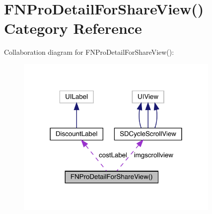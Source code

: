 \hypertarget{category_f_n_pro_detail_for_share_view_07_08}{}\section{F\+N\+Pro\+Detail\+For\+Share\+View() Category Reference}
\label{category_f_n_pro_detail_for_share_view_07_08}


Collaboration diagram for F\+N\+Pro\+Detail\+For\+Share\+View()\+:\nopagebreak
\begin{figure}[H]
\begin{center}
\leavevmode
\includegraphics[width=278pt]{category_f_n_pro_detail_for_share_view_07_08__coll__graph}
\end{center}
\end{figure}

